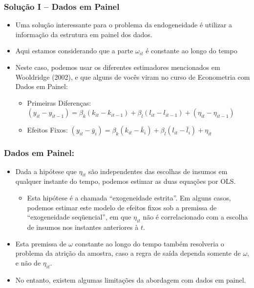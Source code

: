 \documentclass{beamer}
\begin{document}
\begin{frame}\frametitle{Solução I -- Dados em Painel}

\begin{itemize}
\item Uma solução interessante para o problema da endogeneidade é utilizar
a informação da estrutura em painel dos dados.
\item Aqui estamos considerando que a parte $\omega_{it}$ é constante ao
longo do tempo
\item Neste caso, podemos usar os diferentes estimadores mencionados em
Wooldridge (2002), e que alguns de vocês viram no curso de Econometria
com Dados em Painel:

\begin{itemize}
\item Primeiras Diferenças: $(y_{it}-y_{it-1})=\beta_{k}(k_{it}-k_{it-1})+\beta_{l}(l_{it}-l_{it-1})+(\eta_{it}-\eta_{it-1})$
\item Efeitos Fixos: $(y_{it}-\bar{y}_{i})=\beta_{k}(k_{it}-\bar{k}_{i})+\beta_{l}(l_{it}-\bar{l}_{i})+\eta_{it}$
\end{itemize}
\end{itemize}
\end{frame}

\begin{frame}\frametitle{Dados em Painel:}

\begin{itemize}
\item Dada a hipótese que $\eta_{it}$ são independentes das escolhas de
insumos em qualquer instante do tempo, podemos estimar as duas equações
por OLS.

\begin{itemize}
\item Esta hipótese é a chamada ``exogeneidade estrita''. Em alguns casos,
podemos estimar este modelo de efeitos fixos sob a premissa de ``exogeneidade
seqüencial'', em que $\eta_{it}$ não é correlacionado com a escolha
de insumos nos instantes anteriores à $t$.
\end{itemize}
\item Esta premissa de $\omega$ constante ao longo do tempo também resolveria
o problema da atrição da amostra, caso a regra de saída dependa somente
de $\omega$, e não de $\eta_{it}$.
\item No entanto, existem algumas limitações da abordagem com dados em painel.
\end{itemize}
\end{frame}
\end{document}
